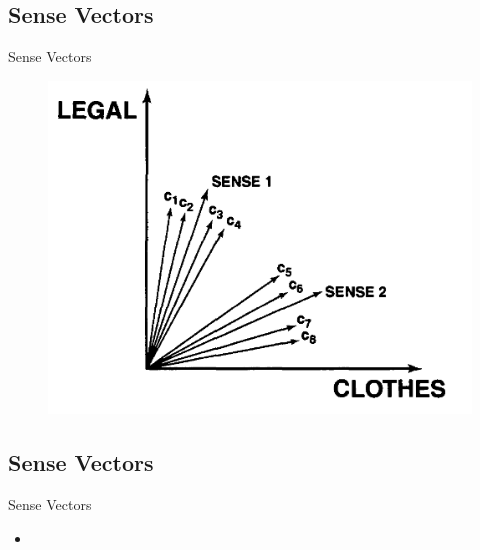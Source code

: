 \documentclass[xcolor=x11names,compress]{beamer}
\renewcommand{\(}{\begin{columns}}
\renewcommand{\)}{\end{columns}}
\newcommand{\<}[1]{\begin{column}{#1}}
\renewcommand{\>}{\end{column}}
\begin{document}
\subsection{Sense Vectors}
\begin{frame}{Sense Vectors}
\begin{figure}
\centering
\includegraphics[scale=0.24, keepaspectratio=True, natwidth=800,natheight=600]{sense_vector.png}
\end{figure}
\end{frame}

\subsection{Sense Vectors}
\begin{frame}{Sense Vectors}
\begin{itemize}
\item %
\end{itemize}
\end{frame}
\end{document}
